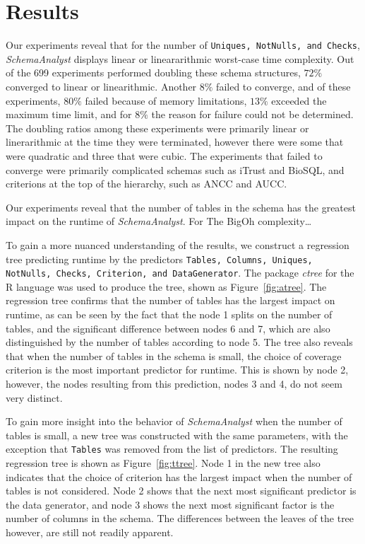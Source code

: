 \section{Results}
  \label{sec:results}



Our experiments reveal that for the number of \texttt{Uniques, NotNulls,
and Checks}, \textit{SchemaAnalyst} displays linear or lineararithmic
worst-case time complexity.  Out of the 699 experiments performed
doubling these schema structures, $72\%$ converged to linear or
linearithmic.  Another $8\%$ failed to converge, and of these experiments,
$80\%$ failed because of memory limitations, $13\%$ exceeded the maximum
time limit, and for $8\%$ the reason for failure could not be
determined.  The doubling ratios among these experiments were primarily
linear or linerarithmic at the time they were terminated, however there
were some that were quadratic and three that were cubic.  The
experiments that failed to converge were primarily complicated schemas
such as iTrust and BioSQL, and criterions at the top of the hierarchy,
such as ANCC and AUCC.

Our experiments reveal that the number of tables in the schema has the
greatest impact on the runtime of \textit{SchemaAnalyst}.  For  The BigOh
complexity\dots 

To gain a more nuanced understanding of the results, we construct a
regression tree predicting runtime by the predictors \texttt{Tables,
Columns, Uniques, NotNulls, Checks, Criterion, and DataGenerator}. The
package \textit{ctree} for the R language was used to produce the tree,
shown as Figure~\ref{fig:atree}. The regression tree confirms that the
number of tables has the largest impact on runtime, as can be seen by
the fact that the node 1 splits on the number of tables, and the
significant difference between nodes 6 and 7, which are also
distinguished by the number of tables according to node 5. The tree also
reveals that when the number of tables in the schema is small, the
choice of coverage criterion is the most important predictor for
runtime.  This is shown by node 2, however, the nodes resulting from this
prediction, nodes 3 and 4, do not seem very distinct.  

To gain more insight into the behavior of \textit{SchemaAnalyst} when
the number of tables is small, a new tree was constructed with the same
parameters, with the exception that \texttt{Tables} was removed from
the list of predictors. The resulting regression tree is shown as
Figure~\ref{fig:ttree}.  Node 1 in the new tree also indicates that
the choice of criterion has the largest impact when the number of tables
is not considered.  Node 2 shows that the next most significant
predictor is the data generator, and node 3 shows the next most
significant factor is the number of columns in the schema.  The
differences between the leaves of the tree however, are still not
readily apparent. 

